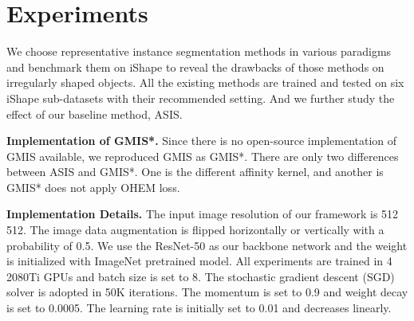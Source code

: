 \section{Experiments}

We choose representative instance segmentation methods in various paradigms and benchmark them on iShape to reveal the drawbacks of those methods on irregularly shaped objects. All the existing methods are trained and tested on six iShape sub-datasets with their recommended setting. And we further study the effect of our baseline method, ASIS. 

\textbf{Implementation of GMIS*.} Since there is no open-source implementation of GMIS \cite{liu2018affinity} available, we reproduced GMIS as GMIS*. There are only two differences between ASIS and GMIS*. One is the different affinity kernel, and another is GMIS* does not apply OHEM loss.


\textbf{Implementation Details.} The input image resolution of our framework is 512  512. The image data augmentation is flipped horizontally or vertically with a probability of 0.5. We use the ResNet-50 \cite{he2015deep} as our backbone network and the weight is initialized with ImageNet \cite{russakovsky2015imagenet} pretrained model. All experiments are trained in 4 2080Ti GPUs and batch size is set to 8. The stochastic gradient descent (SGD) solver is adopted in 50K iterations. The momentum is set to 0.9 and weight decay is set to 0.0005. The learning rate is initially set to 0.01 and decreases linearly. 

